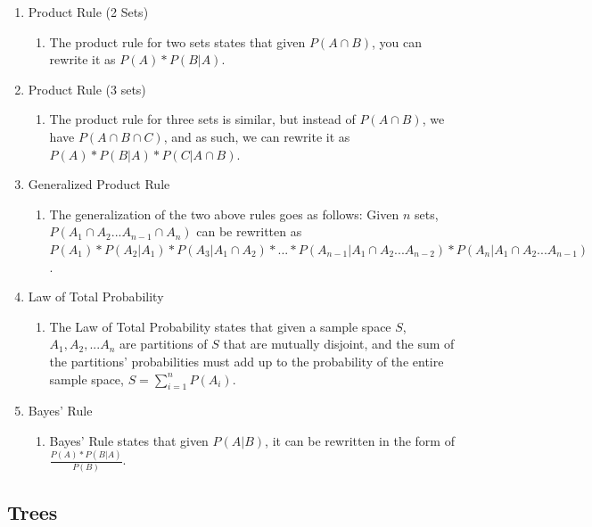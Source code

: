 \documentclass{article}
\begin{document}
\begin{enumerate}
    \item Product Rule (2 Sets)
    \begin{enumerate}
        \item The product rule for two sets states that given $P(A \cap B)$, you can rewrite it as $P(A)*P(B|A)$.
    \end{enumerate}

    \item Product Rule (3 sets)
    \begin{enumerate}
        \item The product rule for three sets is similar, but instead of $P(A \cap B)$, we have $P(A \cap B \cap C)$, and as such, we can rewrite it as $P(A)*P(B|A)*P(C|A \cap B)$.
    \end{enumerate}
    
    \item Generalized Product Rule
    \begin{enumerate}
        \item The generalization of the two above rules goes as follows: Given $n$ sets, $P(A_1 \cap A_2 ... A_{n-1} \cap A_n)$ can be rewritten as $P(A_1)*P(A_2|A_1)*P(A_3|A_1 \cap A_2)*...*P(A_{n-1}|A_1 \cap A_2 ... A_{n-2})*P(A_n|A_1 \cap A_2 ... A_{n-1})$.
    \end{enumerate}
    
    \item Law of Total Probability
    \begin{enumerate}
        \item The Law of Total Probability states that given a sample space $S$, $A_1, A_2, ... A_{n}$ are partitions of $S$ that are mutually disjoint, and the sum of the partitions' probabilities must add up to the probability of the entire sample space, $S = \sum_{i=1}^{n} P(A_i)$.
    \end{enumerate}
    
    \item Bayes' Rule
    \begin{enumerate}
        \item Bayes' Rule states that given $P(A|B)$, it can be rewritten in the form of $\frac{P(A)*P(B|A)}{P(B)}$.
    \end{enumerate}
\end{enumerate}

\newpage
\subsection{Trees}
\end{document}
